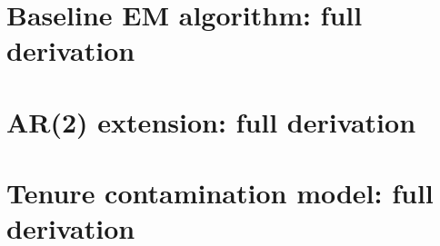 \documentclass[letterpaper,12pt,final]{article}
\begin{document}
\clearpage
\appendix

\section{Baseline EM algorithm: full derivation}\label{app:baseline}






\section{AR(2) extension: full derivation}\label{app:ar2}



\section{Tenure contamination model: full derivation}\label{app:tenure}


\end{document}
